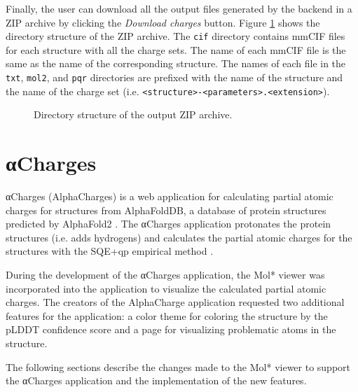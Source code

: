 \documentclass[
  digital,     %
  oneside,     %
  nosansbold,  %
  nocolorbold, %
  lof,         %
  lot,         %
]{fithesis4}
\begin{document}
Finally, the user can download all the output files generated by the backend in a ZIP archive by clicking the \textit{Download charges} button. Figure \ref{fig:output_dir_structure} shows the directory structure of the ZIP archive. The \texttt{cif} directory contains mmCIF files for each structure with all the charge sets. The name of each mmCIF file is the same as the name of the corresponding structure. The names of each file in the \texttt{txt}, \texttt{mol2}, and \texttt{pqr} directories are prefixed with the name of the structure and the name of the charge set (i.e. \texttt{<structure>-<parameters>.<extension>}).

\noindent
\begin{figure}[h]
  \begin{minipage}[t]{10cm}
   \end{minipage}\hfill
\caption{Directory structure of the output ZIP archive.}
\label{fig:output_dir_structure}
\end{figure}

\newpage
\chapter{αCharges}
\label{chapter:alphacharges}

αCharges (AlphaCharges) is a web application for calculating partial atomic charges for structures from AlphaFoldDB, a database of protein structures predicted by AlphaFold2 \cite{jumper2021alphafold}. The αCharges application protonates the protein structures (i.e. adds hydrogens) and calculates the partial atomic charges for the structures with the SQE+qp empirical method \cite{schindler2021sqe}. \cite{schindler2023alphacharges}

During the development of the αCharges application, the Mol* viewer was incorporated into the application to visualize the calculated partial atomic charges. The creators of the AlphaCharge application requested two additional features for the application: a color theme for coloring the structure by the pLDDT confidence score and a page for visualizing problematic atoms in the structure.

The following sections describe the changes made to the Mol* viewer to support the αCharges application and the implementation of the new features.
\end{document}
